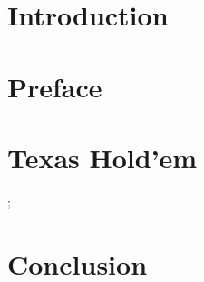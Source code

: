 







\section*{Introduction}



\section*{Preface}

\newpage

\tableofcontents

\listoffigures

%

\section*{Texas Hold'em}




;


\section{Conclusion}

